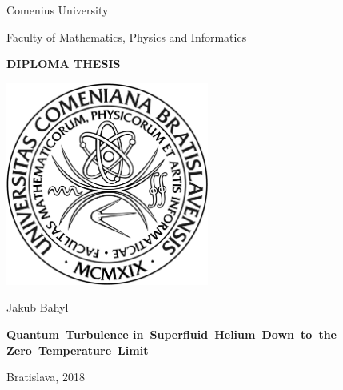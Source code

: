 \begin{center}
	\Large\sf
	Comenius University
	
	Faculty of Mathematics, Physics and Informatics
	\bigskip
	
	{
		\Huge \bfseries \sffamily DIPLOMA THESIS
	}
	
	\vfill
	
	\includegraphics[width=0.5\textwidth]{graphics/fmfi_logo.jpg} 
	
	\vfill
	
	{
		\Huge\sf Jakub Bahyl
	}
	
	\vfill
	
	{
		\Huge \bfseries \sffamily
		\mbox{Quantum Turbulence}
		\mbox{in Superfluid Helium Down to the}
		\mbox{Zero Temperature Limit}
	}
	
	\vfill

	\Large\sf
	Bratislava, 2018

\end{center}

\newpage